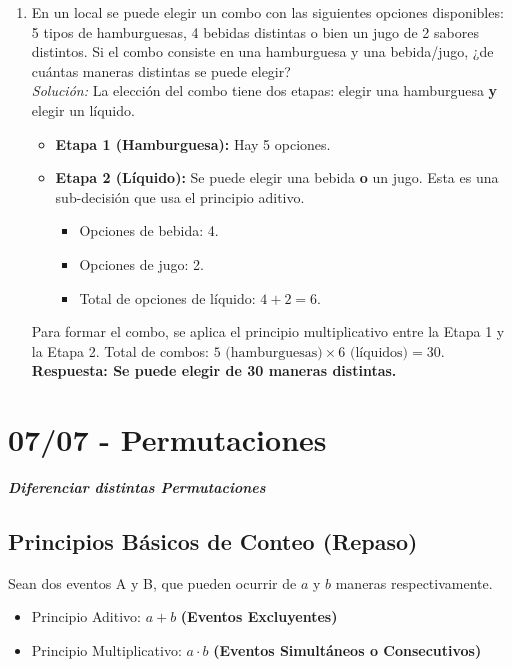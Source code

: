 \documentclass[12pt, letterpaper]{article}
\begin{document}
\begin{enumerate}
	\item En un local se puede elegir un combo con las siguientes opciones disponibles: 5 tipos de hamburguesas, 4 bebidas distintas o bien un jugo de 2 sabores distintos. Si el combo consiste en una hamburguesa y una bebida/jugo, ¿de cuántas maneras distintas se puede elegir? \\
	      \textit{Solución:}
	      La elección del combo tiene dos etapas: elegir una hamburguesa \textbf{y} elegir un líquido.
	      \begin{itemize}
		      \item \textbf{Etapa 1 (Hamburguesa):} Hay 5 opciones.
		      \item \textbf{Etapa 2 (Líquido):} Se puede elegir una bebida \textbf{o} un jugo. Esta es una sub-decisión que usa el principio aditivo.
		            \begin{itemize}
			            \item Opciones de bebida: 4.
			            \item Opciones de jugo: 2.
			            \item Total de opciones de líquido: $4 + 2 = 6$.
		            \end{itemize}
	      \end{itemize}
	      Para formar el combo, se aplica el principio multiplicativo entre la Etapa 1 y la Etapa 2.
	      Total de combos: $5 \text{ (hamburguesas)} \times 6 \text{ (líquidos)} = 30$. \\
	      \textbf{Respuesta: Se puede elegir de 30 maneras distintas.}
\end{enumerate}
\newpage


\section{07/07 - Permutaciones}
\textbf{\textit{\large{Diferenciar distintas Permutaciones}}}

\subsection{Principios Básicos de Conteo (Repaso)}
Sean dos eventos A y B, que pueden ocurrir de $a$ y $b$ maneras respectivamente.
\begin{itemize}
	\item Principio Aditivo: $a + b$ \textbf{ (Eventos Excluyentes)}
	\item Principio Multiplicativo: $a \cdot b$ \textbf{ (Eventos Simultáneos o Consecutivos)}
\end{itemize}
\end{document}
